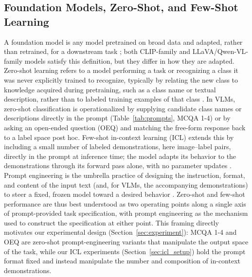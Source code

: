 \documentclass[10pt,letterpaper]{article}
\begin{document}
\subsection{Foundation Models, Zero-Shot, and Few-Shot Learning}
\label{sec:background_learning_paradigms}
A foundation model is any model pretrained on broad data and adapted, rather than retrained, for a downstream task \cite{bommasani_opportunities_2021}; both CLIP-family and LLaVA/Qwen-VL-family models satisfy this definition, but they differ in how they are adapted. Zero-shot learning refers to a model performing a task or recognizing a class it was never explicitly trained to recognize, typically by relating the new class to knowledge acquired during pretraining, such as a class name or textual description, rather than to labeled training examples of that class \cite{xian_zero-shot_2019}. In VLMs, zero-shot classification is operationalized by supplying candidate class names or descriptions directly in the prompt (Table~\ref{tab:prompts}, MCQA 1-4) or by asking an open-ended question (OEQ) and matching the free-form response back to a label space post hoc. Few-shot in-context learning (ICL) extends this by including a small number of labeled demonstrations, here image--label pairs, directly in the prompt at inference time; the model adapts its behavior to the demonstrations through its forward pass alone, with no parameter updates \cite{brown_language_2020, gu_systematic_2023}. Prompt engineering is the umbrella practice of designing the instruction, format, and content of the input text (and, for VLMs, the accompanying demonstrations) to steer a fixed, frozen model toward a desired behavior \cite{sahoo_systematic_2024, schulhoff_prompt_2024}. Zero-shot and few-shot performance are thus best understood as two operating points along a single axis of prompt-provided task specification, with prompt engineering as the mechanism used to construct the specification at either point. This framing directly motivates our experimental design (Section~\ref{sec:experiment}): MCQA 1-4 and OEQ are zero-shot prompt-engineering variants that manipulate the output space of the task, while our ICL experiments (Section~\ref{sec:icl_setup}) hold the prompt format fixed and instead manipulate the number and composition of in-context demonstrations.
\end{document}
